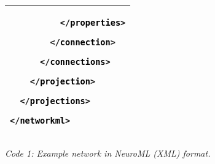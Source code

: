 \documentclass[12pt,twoside]{article}
\begin{document}
\begin{longtable}[c]{|p{14.8cm}|}
\texttt{\textcolor{black}{\ \ \ \ \ \ \ \ \ \ }}\texttt{\textcolor[rgb]{0.6509804,0.09019608,0.0}{{\textless}/}}\texttt{\textcolor{black}{properties}}\texttt{\textcolor[rgb]{0.6509804,0.09019608,0.0}{{\textgreater}}}

\texttt{\textcolor{black}{\ \ \ \ \ \ \ \ }}\texttt{\textcolor[rgb]{0.6509804,0.09019608,0.0}{{\textless}/}}\texttt{\textcolor{black}{connection}}\texttt{\textcolor[rgb]{0.6509804,0.09019608,0.0}{{\textgreater}}}

\texttt{\textcolor{black}{\ \ \ \ \ \ }}\texttt{\textcolor[rgb]{0.6509804,0.09019608,0.0}{{\textless}/}}\texttt{\textcolor{black}{connections}}\texttt{\textcolor[rgb]{0.6509804,0.09019608,0.0}{{\textgreater}}}

\texttt{\textcolor{black}{\ \ \ \ }}\texttt{\textcolor[rgb]{0.6509804,0.09019608,0.0}{{\textless}/}}\texttt{\textcolor{black}{projection}}\texttt{\textcolor[rgb]{0.6509804,0.09019608,0.0}{{\textgreater}}}

\texttt{\textcolor{black}{\ \ }}\texttt{\textcolor[rgb]{0.6509804,0.09019608,0.0}{{\textless}/}}\texttt{\textcolor{black}{projections}}\texttt{\textcolor[rgb]{0.6509804,0.09019608,0.0}{{\textgreater}}}

\texttt{\textcolor[rgb]{0.6509804,0.09019608,0.0}{{\textless}/}}\texttt{\textcolor{black}{networkml}}\texttt{\textcolor[rgb]{0.6509804,0.09019608,0.0}{{\textgreater}}}
\\\hline
\end{longtable}
{\raggedleft\itshape
Code 1: Example network in NeuroML (XML) format.
\par}
\end{document}

